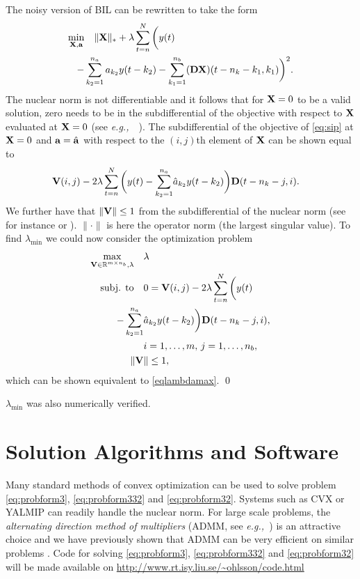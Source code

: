 \documentclass{ifacconf}
\newcommand{\DD}{{\bf D}}
\renewcommand{\aa}{{\bf a}}
\newcommand{\X}{{\bf X}}
\newcommand{\0}{{\bf 0}}
\renewcommand{\a}{a}
\newcommand{\eg}{\textit{e.g.,~}}
\def\subjto{{\mbox{subj. to}}}
\renewcommand{\Re}{{\mathbb{R}}}
\begin{document}
\begin{pf}
The noisy version of BIL can be rewritten to take the form
\begin{align} \nonumber
\min_{\X, \aa}  &\quad    \|\X\|_*  + \lambda \sum_{t=n}^N\bigg(
y(t)\\ \label{eq:sip}-&\sum_{k_2=1}^{n_a} \a_{k_2}
 y(t-k_2)
-  \sum_{k_1=1}^{n_b} (\DD \X)(t-n_k-k_1,k_1) \bigg)^2.
\end{align}
The nuclear norm is not differentiable and it follows that for $\X=0$ to be a valid solution,
zero needs to
be in the subdifferential of the objective with respect to $\X$
evaluated at $\X=0$ (see \eg~\citet[Prop.~4.7.2]{Bert03}).
The subdifferential of the objective of \eqref{eq:sip} at $\X=0$ and
$\aa=\hat\aa$ with
respect to the $(i,j)$th element of $\X$ can be shown
equal to
\begin{align} 
       {\bf V }(i,j) - 2 \lambda \sum_{t=n}^N\bigg(
y(t)   \label{eq:sip45}-\sum_{k_2=1}^{n_a} &\hat \a_{k_2} 
 y(t-k_2) \bigg) 
   \DD(t-n_k-j,i).
\end{align}
 We further have that $\|{\bf V}\|\leq 1$ from the subdifferential of
 the nuclear norm (see for instance \citet{Watson199233} or \citet{recht10}). $\|\cdot \|$ is here  the operator norm (the largest singular
value). To find $\lambda_{\text{min}} $ we could now consider the
optimization problem 
\begin{subequations}
\begin{align} \max_{{\bf V}
    \in\Re^{m\times n_b} ,\lambda}  \quad &
 \lambda \\ \nonumber \subjto \quad & 0=  {\bf V }(i,j) - 2 \lambda \sum_{t=n}^N\bigg(
y(t)  \\ \label{eq:sip46}-\sum_{k_2=1}^{n_a} &\hat \a_{k_2} 
 y(t-k_2) \bigg) 
   \DD(t-n_k-j,i), \\ & i=1,\dots, m, \,j=1,\dots,n_b,\\\|{\bf V}&\|\leq 1,
\end{align}
\end{subequations}which can be shown equivalent to \eqref{eqlambdamax}.
\qed
\end{pf}


$\lambda_{\text{min}} $ was also numerically verified. 

\section{Solution Algorithms and Software}

Many standard methods of convex optimization can be used to solve
problem \eqref{eq:probform3},
\eqref{eq:probform332} and \eqref{eq:probform32}. 
Systems such as CVX \citep{cvx1,cvx2} or YALMIP \citep{Yalmip}
can readily handle the nuclear norm. For large scale problems, the \textit{alternating direction
method of multipliers} (ADMM, see \eg \cite{bert:97,boyd:11}) is an attractive choice and we have
previously shown that ADMM can be very efficient on similar
problems \cite{ohlsson:13}. Code for solving
\eqref{eq:probform3}, \eqref{eq:probform332} and \eqref{eq:probform32} will
be made
available on \url{http://www.rt.isy.liu.se/~ohlsson/code.html}
\end{document}
